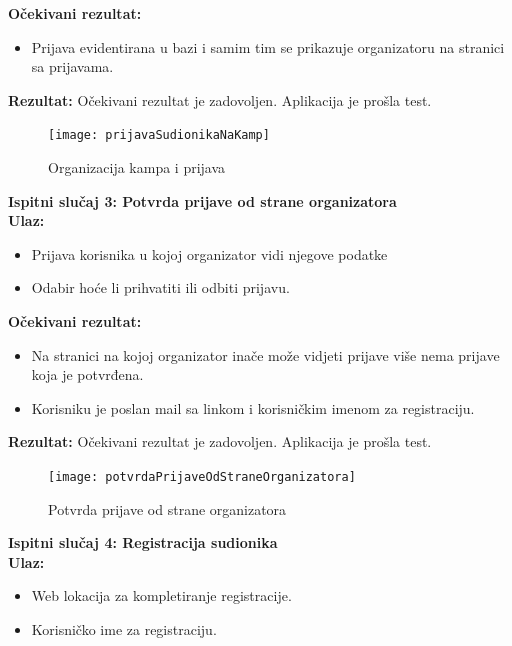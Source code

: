 				\textbf{Očekivani rezultat:}
					\begin{itemize}
						\item {Prijava evidentirana u bazi i samim tim se prikazuje organizatoru na stranici sa prijavama.}
					\end{itemize}
			
				{\textbf{Rezultat:} Očekivani rezultat je zadovoljen. Aplikacija je prošla test.\\}
			
			\begin{figure}[h]
				\centering
				\texttt{[image: prijavaSudionikaNaKamp]}
				\caption{Organizacija kampa i prijava}
			\end{figure}
			
			\clearpage
			
			\textbf{Ispitni slučaj 3: Potvrda prijave od strane organizatora\\}
				\indent\textbf{Ulaz:}
					\begin{itemize}
						\item {Prijava korisnika u kojoj organizator vidi njegove podatke}
						\item {Odabir hoće li prihvatiti ili odbiti prijavu.}
					\end{itemize}
			
				\textbf{Očekivani rezultat:}
					\begin{itemize}
						\item {Na stranici na kojoj organizator inače može vidjeti prijave više nema prijave koja je potvrđena.}
						\item {Korisniku je poslan mail sa linkom i korisničkim imenom za registraciju.}
					\end{itemize}
			
				{\textbf{Rezultat:} Očekivani rezultat je zadovoljen. Aplikacija je prošla test.\\}
			
			\begin{figure}[h]
				\centering
				\texttt{[image: potvrdaPrijaveOdStraneOrganizatora]}
				\caption{Potvrda prijave od strane organizatora}
			\end{figure}

			
			\clearpage
			
			\textbf{Ispitni slučaj 4: Registracija sudionika\\}
			\indent\textbf{Ulaz:}
				\begin{itemize}
					\item {Web lokacija za kompletiranje registracije.}
					\item {Korisničko ime za registraciju.}
				\end{itemize}
			
